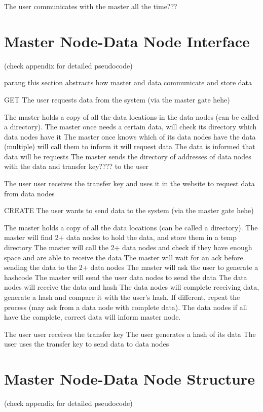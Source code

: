 \documentclass[acmsmall]{acmart}
\begin{document}
The user communicates with the master all the time???


\section{Master Node-Data Node Interface}
(check appendix for detailed pseudocode)

parang this section abstracts how master and data communicate and store data

GET
The user requests data from the system (via the master gate hehe)

The master holds a copy of all the data locations in the data nodes (can be called a directory). 
The master once needs a certain data, will check its directory which data nodes have it
The master once knows which of its data nodes have the data (multiple) will call them to inform it will request data
The data is informed that data will be requests
The master sends the directory of addresses of data nodes with the data and transfer key???? to the user

The user user receives the transfer key and uses it in the website to request data from data nodes

CREATE
The user wants to send data to the system (via the master gate hehe)

The master holds a copy of all the data locations (can be called a directory). 
The master will find 2+ data nodes to hold the data, and store them in a temp directory
The master will call the 2+ data nodes and check if they have enough space and are able to receive the data
The master will wait for an ack before sending the data to the 2+ data nodes
The master will ask the user to generate a hashcode
The master will send the user data nodes to send the data
The data nodes will receive the data and hash
The data nodes will complete receiving data, generate a hash and compare it with the user's hash. If different, repeat the process (may ask from a data node with complete data).
The data nodes if all have the complete, correct data will inform master node.

The user user receives the transfer key 
The user generates a hash of its data
The user uses the transfer key to send data to data nodes

\section{Master Node-Data Node Structure}
(check appendix for detailed pseudocode)
\end{document}
